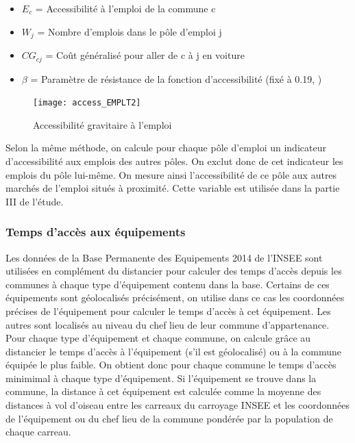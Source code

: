 \documentclass[10.5pt,a4paper]{article}
\begin{document}
{\begin{itemize}[font=\tiny]
	\item $E_c$ = Accessibilité à l'emploi de la commune  c
	\item $W_j$ = Nombre d'emplois dans le pôle d'emploi j
	\item $CG_{cj}$ = Coût généralisé pour aller de c à j en voiture
	\item $\beta$ = Paramètre de résistance de la fonction d'accessibilité (fixé à 0.19, \cite{Mercier08})
 \end{itemize}


\begin{figure}[h!]%
\caption{Accessibilité gravitaire à l'emploi}
\texttt{[image: access\_EMPLT2]}
\label{Access_EMPLT}%
\end{figure}
 
Selon la même méthode, on calcule pour chaque pôle d'emploi un indicateur d'accessibilité aux emplois des autres pôles. On exclut donc de cet indicateur les emplois du pôle lui-même. On mesure ainsi l'accessibilité de ce pôle aux autres marchés de l'emploi situés à proximité. Cette variable est utilisée dans la partie III de l'étude.\par

\subsubsection{Temps d'accès aux équipements}

Les données de la Base Permanente des Equipements 2014 de l'INSEE sont utilisées en complément du distancier pour calculer des temps d'accès depuis les communes à chaque type d'équipement contenu dans la base. Certains de ces équipements sont géolocalisés précisément, on utilise dans ce cas les coordonnées précises de l'équipement pour calculer le temps d'accès à cet équipement. Les autres sont localisés au niveau du chef lieu de leur commune d'appartenance. Pour chaque type d'équipement et chaque commune, on calcule grâce au distancier le temps d'accès à l'équipement (s'il est géolocalisé) ou à la commune équipée le plus faible. On obtient donc pour chaque commune le temps d'accès minimimal à chaque type d'équipement. Si l'équipement se trouve dans la commune, la distance à cet équipement est calculée comme la moyenne des distances à vol d'oiseau entre les carreaux du carroyage INSEE et les coordonnées de l'équipement ou du chef lieu de la commune pondérée par la population de chaque carreau. \par

}
\end{document}
